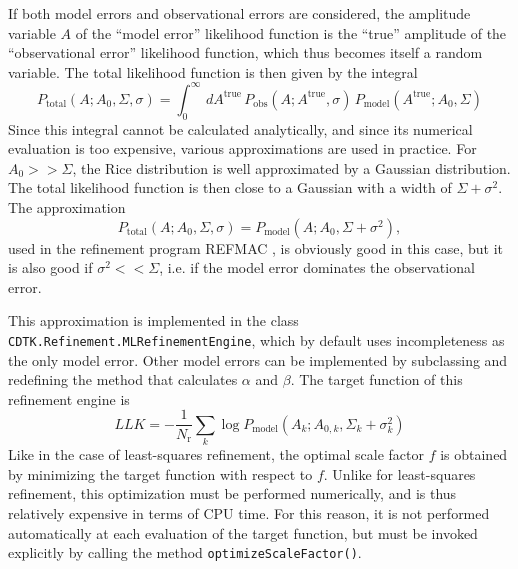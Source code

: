 \documentclass[11pt]{article}
\begin{document}
\begin{sloppy}
If both model errors and observational errors are considered,
the amplitude variable $A$ of the ``model error'' likelihood function
is the ``true'' amplitude of the ``observational error'' likelihood
function, which thus becomes itself a random variable. The total
likelihood function is then given by the integral
\begin{equation}
P_{\mbox{total}}(A; A_0, \Sigma, \sigma) = 
   \int_0^{\infty} \, d A^{\mbox{true}} \,
      P_{\mbox{obs}}(A; A^{\mbox{true}}, \sigma) \,
      P_{\mbox{model}}(A^{\mbox{true}}; A_0, \Sigma)
\end{equation}
Since this integral cannot be calculated analytically, and since its
numerical evaluation is too expensive, various approximations are used
in practice. For $A_0 >> \Sigma$, the Rice distribution is well
approximated by a Gaussian distribution. The total likelihood function
is then close to a Gaussian with a width of $\Sigma+\sigma^2$. The
approximation
\begin{equation}
P_{\mbox{total}}(A; A_0, \Sigma, \sigma) = 
    P_{\mbox{model}}(A; A_0, \Sigma+\sigma^2),
\end{equation}
used in the refinement program REFMAC \cite{MuVaDo1997}, is obviously
good in this case, but it is also good if $\sigma^2 << \Sigma$, i.e.
if the model error dominates the observational error.

This approximation is implemented in the class
\texttt{CDTK.Refinement.MLRefinementEngine}, which by default
uses incompleteness as the only model error. Other model errors
can be implemented by subclassing and redefining the method that
calculates $\alpha$ and $\beta$. The target function of this
refinement engine is
\begin{equation}
\label{eq:ml_target}
LLK = -\frac{1}{N_{\mbox{r}}}
      \sum_k \log P_{\mbox{model}}(A_k; A_{0, k}, \Sigma_k+\sigma_k^2)
\end{equation}
Like in the case of least-squares refinement, the optimal scale factor
$f$ is obtained by minimizing the target function with respect to $f$.
Unlike for least-squares refinement, this optimization must be
performed numerically, and is thus relatively expensive in terms
of CPU time. For this reason, it is not performed automatically at
each evaluation of the target function, but must be invoked explicitly
by calling the method \texttt{optimizeScaleFactor()}.


\end{sloppy}
\end{document}
